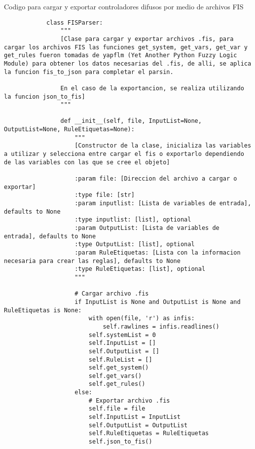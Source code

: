     \begin{longlisting}
        \caption[Codigo para el manejo de archivos FIS]{Codigo para cargar y exportar controladores difusos por medio de archivos FIS}
        \label{code:1}				
        \begin{verbatim}
            class FISParser:
                """
                [Clase para cargar y exportar archivos .fis, para cargar los archivos FIS las funciones get_system, get_vars, get_var y get_rules fueron tomadas de yapflm (Yet Another Python Fuzzy Logic Module) para obtener los datos necesarias del .fis, de alli, se aplica la funcion fis_to_json para completar el parsin.
                
                En el caso de la exportancion, se realiza utilizando la funcion json_to_fis]
                """

                def __init__(self, file, InputList=None, OutputList=None, RuleEtiquetas=None):
                    """
                    [Constructor de la clase, inicializa las variables a utilizar y selecciona entre cargar el fis o exportarlo dependiendo de las variables con las que se cree el objeto]
                    
                    :param file: [Direccion del archivo a cargar o exportar]
                    :type file: [str]
                    :param inputlist: [Lista de variables de entrada], defaults to None
                    :type inputlist: [list], optional
                    :param OutputList: [Lista de variables de entrada], defaults to None
                    :type OutputList: [list], optional
                    :param RuleEtiquetas: [Lista con la informacion necesaria para crear las reglas], defaults to None
                    :type RuleEtiquetas: [list], optional
                    """

                    # Cargar archivo .fis
                    if InputList is None and OutputList is None and RuleEtiquetas is None:
                        with open(file, 'r') as infis:
                            self.rawlines = infis.readlines()
                        self.systemList = 0
                        self.InputList = []
                        self.OutputList = []
                        self.RuleList = []
                        self.get_system()
                        self.get_vars()
                        self.get_rules()
                    else:
                        # Exportar archivo .fis
                        self.file = file
                        self.InputList = InputList
                        self.OutputList = OutputList
                        self.RuleEtiquetas = RuleEtiquetas
                        self.json_to_fis()


\end{verbatim}
\end{longlisting}
